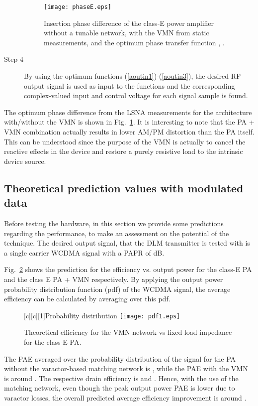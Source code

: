 \documentclass[10pt,journal]{IEEEtran}
\begin{document}
\begin{description}
    \begin{figure}
    \centering
    \texttt{[image: phaseE.eps]}
    \caption{Insertion phase difference of the class-E power amplifier without
    a tunable network, with the VMN from static measurements, and the optimum phase transfer function , .} \label{phaseE}
    \end{figure}

\item[Step 4] By using the optimum functions (\ref{aoutin1})-(\ref{aoutin3}), the desired RF output signal is used as input to the functions and the corresponding complex-valued input  and control voltage  for each signal sample is found.
\end{description}

The optimum phase difference from the LSNA measurements for the architecture with/without the VMN is shown in Fig.~\ref{phaseE}. It is interesting to note that the PA + VMN combination actually results in lower AM/PM distortion than the PA itself. This can be understood since the purpose of the VMN is actually to cancel the reactive effects in the device and restore a purely resistive load to the intrinsic device source.

\subsection{Theoretical prediction values with modulated data}

Before testing the hardware, in this section we provide some predictions regarding the performance, to make an assessment on the potential of the technique. The desired output signal,  that the DLM transmitter is tested with is a single carrier WCDMA signal with a PAPR of  dB.

Fig.~\ref{pdfE} shows the prediction for the efficiency vs. output power for the class-E PA and the class E PA + VMN respectively. By applying the output power probability distribution function (pdf) of the WCDMA signal, the average efficiency can be calculated by averaging over this pdf.

\begin{figure}
\centering
{}[c][c][1]{Probability distribution}
\texttt{[image: pdf1.eps]}
\caption{Theoretical efficiency for the VMN network vs fixed  load impedance for the class-E PA.} \label{pdfE}
\end{figure}

The PAE averaged over the probability distribution of the signal for the PA without the varactor-based matching network is , while the PAE with the
VMN is around . The respective drain efficiency is  and
. Hence, with the use of the matching network, even though the peak
output power PAE is lower due to varactor losses, the overall predicted average efficiency improvement is around .
\end{document}
